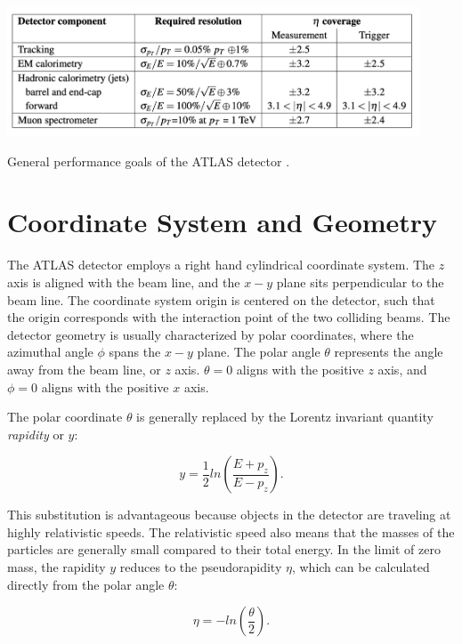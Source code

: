 \begin{table}[!htbp]
	\centering
	\includegraphics[width=0.92\textwidth]{figures/ch4/atlas_requirements}
	\caption{General performance goals of the ATLAS detector \cite{atlas_overview}.
	\label{tab:atlas_requirements}}
\end{table}

\section{Coordinate System and Geometry}

\indent The ATLAS detector employs a right hand cylindrical coordinate system. The $z$ axis is aligned with the beam line, and the $x-y$ plane sits perpendicular to the beam line. The coordinate system origin is centered on the detector, such that the origin corresponds with the interaction point of the two colliding beams. The detector geometry is usually characterized by polar coordinates, where the azimuthal angle $\phi$ spans the $x-y$ plane. The polar angle $\theta$ represents the angle away from the beam line, or $z$ axis. $\theta = 0$ aligns with the positive $z$ axis, and $\phi = 0$ aligns with the positive $x$ axis. \par

\indent The polar coordinate $\theta$ is generally replaced by the Lorentz invariant quantity \textit{rapidity} or $y$:

\begin{equation}
	y = \frac{1}{2} ln(\frac{E+p_z}{E-p_z}) .
	\label{eq:rapidity}
\end{equation}

This substitution is advantageous because objects in the detector are traveling at highly relativistic speeds. The relativistic speed also means that the masses of the particles are generally small compared to their total energy. In the limit of zero mass, the rapidity $y$ reduces to the pseudorapidity $\eta$, which can be calculated directly from the polar angle $\theta$:

\begin{equation}
	\eta = -ln(\frac{\theta}{2}) .
\end{equation}

